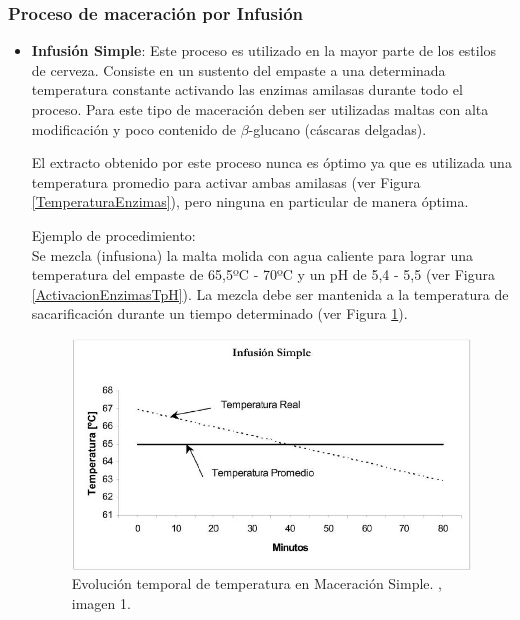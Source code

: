             \subsubsection{Proceso de maceración por Infusión}
                \begin{itemize}
                    \item \textbf{Infusión Simple}: Este proceso es utilizado en la mayor parte de los estilos de cerveza. Consiste en un sustento del empaste a una determinada temperatura constante activando las enzimas amilasas durante todo el proceso. Para este tipo de maceración deben ser utilizadas maltas con alta modificación y poco contenido de $\beta$-glucano (cáscaras delgadas).
                    
                    \par El extracto obtenido por este proceso nunca es óptimo ya que es utilizada una temperatura promedio para activar ambas amilasas (ver Figura \ref{TemperaturaEnzimas}), pero ninguna en particular de manera óptima.
                    
                    \par Ejemplo de procedimiento: \\ Se mezcla (infusiona) la malta molida con agua caliente para lograr una temperatura del empaste de 65,5ºC - 70ºC y un pH de 5,4 - 5,5 (ver Figura \ref{ActivacionEnzimasTpH}). La mezcla debe ser mantenida a la temperatura de sacarificación durante un tiempo determinado (ver Figura \ref{MaceracionSimple}).
                    
                    \begin{figure} [H]		                                                            \centerline{\includegraphics[scale=0.7]{maceracion_simple.jpg}}
                        \caption{Evolución temporal de temperatura en Maceración Simple. \cite{Ceresvis}, imagen 1.}
                        \label{MaceracionSimple}
                    \end{figure}
                    

\end{itemize}
